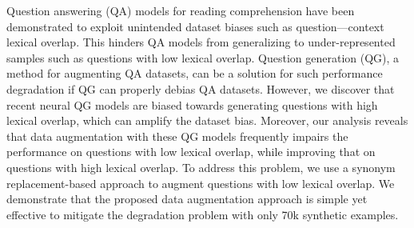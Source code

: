Question answering (QA) models for reading comprehension have been demonstrated to exploit unintended dataset biases such as question---context lexical overlap. This hinders QA models from generalizing to under-represented samples such as questions with low lexical overlap. Question generation (QG), a method for augmenting QA datasets, can be a solution for such performance degradation if QG can properly debias QA datasets. However, we discover that recent neural QG models are biased towards generating questions with high lexical overlap, which can amplify the dataset bias. Moreover, our analysis reveals that data augmentation with these QG models frequently impairs the performance on questions with low lexical overlap, while improving that on questions with high lexical overlap. To address this problem, we use a synonym replacement-based approach to augment questions with low lexical overlap. We demonstrate that the proposed data augmentation approach is simple yet effective to mitigate the degradation problem with only 70k synthetic examples.
